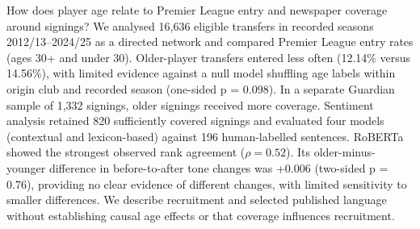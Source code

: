 How does player age relate to Premier League entry and newspaper coverage around signings? We analysed 16,636 eligible transfers in recorded seasons 2012/13--2024/25 as a directed network and compared Premier League entry rates (ages 30+ and under 30). Older-player transfers entered less often (12.14\% versus 14.56\%), with limited evidence against a null model shuffling age labels within origin club and recorded season (one-sided p = 0.098). In a separate Guardian sample of 1,332 signings, older signings received more coverage. Sentiment analysis retained 820 sufficiently covered signings and evaluated four models (contextual and lexicon-based) against 196 human-labelled sentences. RoBERTa showed the strongest observed rank agreement ($\rho = 0.52$). Its older-minus-younger difference in before-to-after tone changes was +0.006 (two-sided p = 0.76), providing no clear evidence of different changes, with limited sensitivity to smaller differences. We describe recruitment and selected published language without establishing causal age effects or that coverage influences recruitment.
